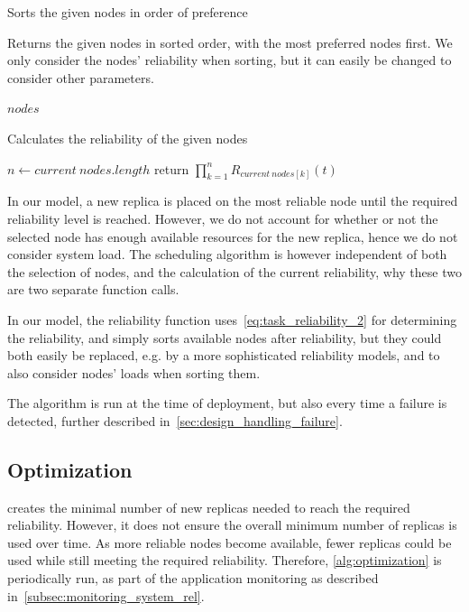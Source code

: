 \documentclass{cslthse-msc}
\begin{document}
\begin{function} 
	\caption{Sorts the given nodes in order of preference} \label{func:sort}
	Returns the given nodes in sorted order, with the most preferred nodes first. We only consider the nodes' reliability when sorting, but it can easily be changed to consider other parameters.
	\begin{algorithmic}[1]
	\Statex
		\Statex{}
		\State
	    \State \Return $nodes$
	\EndFunction
	\end{algorithmic}
\end{function}

\begin{function} 
	\caption{Calculates the reliability of the given nodes} \label{func:calc_reliability}
	\begin{algorithmic}[1]
	\Statex
		\State $n\gets current\ nodes.length$
		\State return $ \prod\limits_{k=1}^n R_{current\ nodes[k]}(t)$
	\EndFunction
	\end{algorithmic}
\end{function}

In our model, a new replica is placed on the most reliable node until the required reliability level is reached. However, we do not account for whether or not the selected node has enough available resources for the new replica, hence we do not consider system load. The scheduling algorithm is however independent of both the selection of nodes, and the calculation of the current reliability, why these two are two separate function calls. 

In our model, the reliability function uses~\cref{eq:task_reliability_2} for determining the reliability, and simply sorts available nodes after reliability, but they could both easily be replaced, e.g. by a more sophisticated reliability models, and to also consider nodes' loads when sorting them.

The algorithm is run at the time of deployment, but also every time a failure is detected, further described in~\cref{sec:design_handling_failure}.

\subsection{Optimization} \label{subsec:design_optimization}
 creates the minimal number of new replicas needed to reach the required reliability. However, it does not ensure the overall minimum number of replicas is used over time. As more reliable nodes become available, fewer replicas could be used while still meeting the required reliability. Therefore, \cref{alg:optimization} is periodically run, as part of the application monitoring as described in~\cref{subsec:monitoring_system_rel}.
\end{document}
